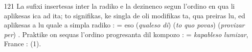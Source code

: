 \begin{VUpage}[125]{121}
La sufixi insertesas inter la radiko e la dezinenco segun\nl
l'ordino en qua li aplikesas ica ad ita; to signifikas, ke\nl
singla de oli modifikas ta, qua preiras lu, ed aplikesas a\nl
lu quale a simpla radiko :  = eso (\textit{qualeso di})\nl
{} (\textit{to quo povas})  (\textit{provizar per}) . Praktike on\nl
sequas l'ordino progresanta dil kompozo : \nl
{} = \textit{kapableso lumizar}, France : \cc
{} (1).
\end{VUpage}

